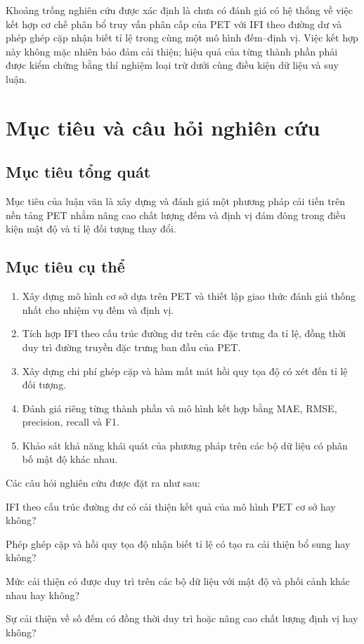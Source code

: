 Khoảng trống nghiên cứu được xác định là chưa có đánh giá có hệ thống về việc kết hợp cơ chế phân bổ truy vấn phân cấp của PET với IFI theo đường dư và phép ghép cặp nhận biết tỉ lệ trong cùng một mô hình đếm--định vị. Việc kết hợp này không mặc nhiên bảo đảm cải thiện; hiệu quả của từng thành phần phải được kiểm chứng bằng thí nghiệm loại trừ dưới cùng điều kiện dữ liệu và suy luận.

\section{Mục tiêu và câu hỏi nghiên cứu}

\subsection{Mục tiêu tổng quát}

Mục tiêu của luận văn là xây dựng và đánh giá một phương pháp cải tiến trên nền tảng PET nhằm nâng cao chất lượng đếm và định vị đám đông trong điều kiện mật độ và tỉ lệ đối tượng thay đổi.

\subsection{Mục tiêu cụ thể}

\begin{enumerate}[label=\arabic*)]
    \item Xây dựng mô hình cơ sở dựa trên PET và thiết lập giao thức đánh giá thống nhất cho nhiệm vụ đếm và định vị.
    \item Tích hợp IFI theo cấu trúc đường dư trên các đặc trưng đa tỉ lệ, đồng thời duy trì đường truyền đặc trưng ban đầu của PET.
    \item Xây dựng chi phí ghép cặp và hàm mất mát hồi quy tọa độ có xét đến tỉ lệ đối tượng.
    \item Đánh giá riêng từng thành phần và mô hình kết hợp bằng MAE, RMSE, precision, recall và F1.
    \item Khảo sát khả năng khái quát của phương pháp trên các bộ dữ liệu có phân bố mật độ khác nhau.
\end{enumerate}

Các câu hỏi nghiên cứu được đặt ra như sau:

\begin{description}[style=nextline,leftmargin=1.7cm,labelindent=0cm]
    \item[RQ1.] IFI theo cấu trúc đường dư có cải thiện kết quả của mô hình PET cơ sở hay không?
    \item[RQ2.] Phép ghép cặp và hồi quy tọa độ nhận biết tỉ lệ có tạo ra cải thiện bổ sung hay không?
    \item[RQ3.] Mức cải thiện có được duy trì trên các bộ dữ liệu với mật độ và phối cảnh khác nhau hay không?
    \item[RQ4.] Sự cải thiện về số đếm có đồng thời duy trì hoặc nâng cao chất lượng định vị hay không?
\end{description}

